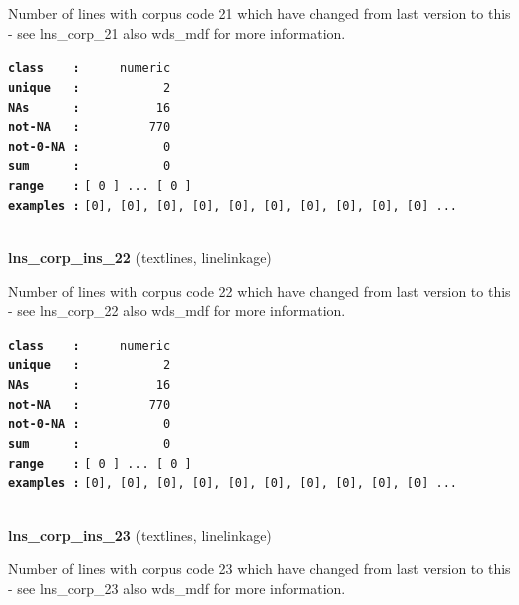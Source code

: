 \documentclass[]{article}
\begin{document}
Number of lines with corpus code 21 which have changed from last version
to this - see lns\_corp\_21 also wds\_mdf for more information.

\textbf{\texttt{class\ \ \ \ :}} \texttt{~~~~~numeric}\\
\textbf{\texttt{unique\ \ \ :}} \texttt{~~~~~~~~~~~2}\\
\textbf{\texttt{NAs\ \ \ \ \ \ :}} \texttt{~~~~~~~~~~16}\\
\textbf{\texttt{not-NA\ \ \ :}} \texttt{~~~~~~~~~770}\\
\textbf{\texttt{not-0-NA\ :}} \texttt{~~~~~~~~~~~0}\\
\textbf{\texttt{sum\ \ \ \ \ \ :}} \texttt{~~~~~~~~~~~0}\\
\textbf{\texttt{range\ \ \ \ :}}
\texttt{{[}\ 0\ {]}\ ...\ {[}\ 0\ {]}}\\
\textbf{\texttt{examples\ :}}
\texttt{{[}0{]},\ {[}0{]},\ {[}0{]},\ {[}0{]},\ {[}0{]},\ {[}0{]},\ {[}0{]},\ {[}0{]},\ {[}0{]},\ {[}0{]}\ ...}\\

~

\textbf{lns\_corp\_ins\_22} (textlines, linelinkage)

Number of lines with corpus code 22 which have changed from last version
to this - see lns\_corp\_22 also wds\_mdf for more information.

\textbf{\texttt{class\ \ \ \ :}} \texttt{~~~~~numeric}\\
\textbf{\texttt{unique\ \ \ :}} \texttt{~~~~~~~~~~~2}\\
\textbf{\texttt{NAs\ \ \ \ \ \ :}} \texttt{~~~~~~~~~~16}\\
\textbf{\texttt{not-NA\ \ \ :}} \texttt{~~~~~~~~~770}\\
\textbf{\texttt{not-0-NA\ :}} \texttt{~~~~~~~~~~~0}\\
\textbf{\texttt{sum\ \ \ \ \ \ :}} \texttt{~~~~~~~~~~~0}\\
\textbf{\texttt{range\ \ \ \ :}}
\texttt{{[}\ 0\ {]}\ ...\ {[}\ 0\ {]}}\\
\textbf{\texttt{examples\ :}}
\texttt{{[}0{]},\ {[}0{]},\ {[}0{]},\ {[}0{]},\ {[}0{]},\ {[}0{]},\ {[}0{]},\ {[}0{]},\ {[}0{]},\ {[}0{]}\ ...}\\

~

\textbf{lns\_corp\_ins\_23} (textlines, linelinkage)

Number of lines with corpus code 23 which have changed from last version
to this - see lns\_corp\_23 also wds\_mdf for more information.
\end{document}
